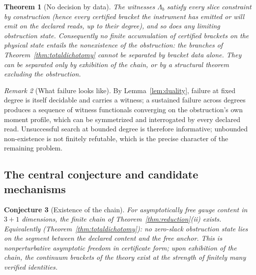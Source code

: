 \documentclass[11pt]{article}
\newtheorem{theorem}{Theorem}[section]
\newtheorem{conjecture}[theorem]{Conjecture}
\theoremstyle{definition}
\theoremstyle{remark}
\newtheorem{remark}[theorem]{Remark}
\begin{document}
\begin{theorem}[No decision by data]\label{thm:nogo}
The witnesses $\Lambda_b$ satisfy every slice constraint by
construction (hence every certified bracket the instrument has emitted
or will emit on the declared reads, up to their degree), and so does any
limiting obstruction state.  Consequently no finite accumulation of
certified brackets on the physical state entails the nonexistence of the
obstruction: the branches of Theorem~\ref{thm:totaldichotomy} cannot be
separated by bracket data alone.  They can be separated only by
exhibition of the chain, or by a structural theorem excluding the
obstruction.
\end{theorem}

\begin{remark}[What failure looks like]
By Lemma~\ref{lem:duality}, failure at fixed degree is itself decidable
and carries a witness; a sustained failure across degrees produces a
sequence of witness functionals converging on the obstruction's own
moment profile, which can be symmetrized and interrogated by every
declared read.  Unsuccessful search at bounded degree is therefore
informative; unbounded non-existence is not finitely refutable, which is
the precise character of the remaining problem.
\end{remark}

\subsection{The central conjecture and candidate mechanisms}
\begin{conjecture}[Existence of the chain]\label{conj:chain}
For asymptotically free gauge content in $3{+}1$ dimensions, the finite
chain of Theorem~\ref{thm:reduction}(ii) exists.  Equivalently
(Theorem~\ref{thm:totaldichotomy}): no zero-slack obstruction state lies
on the segment between the declared content and the free anchor.  This
is nonperturbative asymptotic freedom in certificate form; upon
exhibition of the chain, the continuum brackets of the theory exist at
the strength of finitely many verified identities.
\end{conjecture}
\end{document}
